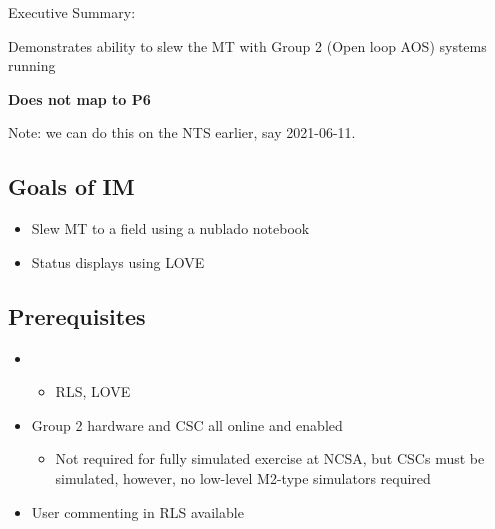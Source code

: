 
Executive Summary:

Demonstrates ability to slew the MT with Group 2 (Open loop AOS) systems running

\textbf{Does not map to P6}

Note: we can do this on the NTS earlier, say 2021-06-11.

\subsection{Goals of IM}
\begin{itemize}
\item Slew \gls{MT} to a field using a nublado notebook
\item Status displays using \gls{LOVE}
\end{itemize}

\subsection{Prerequisites}
\begin{itemize}
\item{}
  \begin{itemize}
  \item \gls{RLS}, \gls{LOVE}
  \end{itemize}
\item{Group 2 hardware and \gls{CSC} all online and enabled}
  \begin{itemize}
  \item Not required for fully simulated exercise at NCSA, but \glspl{CSC} must be simulated,
    however, no low-level M2-type simulators required
  \end{itemize}
\item{User commenting in \gls{RLS} available}
\end{itemize}

